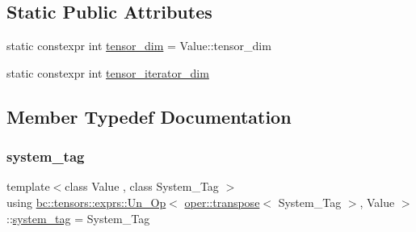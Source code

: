\subsection*{Static Public Attributes}
\begin{DoxyCompactItemize}
\item 
static constexpr int \hyperlink{structbc_1_1tensors_1_1exprs_1_1Un__Op_3_01oper_1_1transpose_3_01System__Tag_01_4_00_01Value_01_4_afd4338e3d63a8fd0d6b4624cc3bf820b}{tensor\+\_\+dim} = Value\+::tensor\+\_\+dim
\item 
static constexpr int \hyperlink{structbc_1_1tensors_1_1exprs_1_1Un__Op_3_01oper_1_1transpose_3_01System__Tag_01_4_00_01Value_01_4_ab57e34ead863ca25ad8655b39d0712f1}{tensor\+\_\+iterator\+\_\+dim}
\end{DoxyCompactItemize}


\subsection{Member Typedef Documentation}
\mbox{\label{structbc_1_1tensors_1_1exprs_1_1Un__Op_3_01oper_1_1transpose_3_01System__Tag_01_4_00_01Value_01_4_aebdf1bf20e63a8917fbd036e56bfd191}} 
\subsubsection{\texorpdfstring{system\+\_\+tag}{system\_tag}}
{\footnotesize\ttfamily template$<$class Value , class System\+\_\+\+Tag $>$ \\
using \hyperlink{structbc_1_1tensors_1_1exprs_1_1Un__Op}{bc\+::tensors\+::exprs\+::\+Un\+\_\+\+Op}$<$ \hyperlink{structbc_1_1oper_1_1transpose}{oper\+::transpose}$<$ System\+\_\+\+Tag $>$, Value $>$\+::\hyperlink{structbc_1_1tensors_1_1exprs_1_1Un__Op_3_01oper_1_1transpose_3_01System__Tag_01_4_00_01Value_01_4_aebdf1bf20e63a8917fbd036e56bfd191}{system\+\_\+tag} =  System\+\_\+\+Tag}

